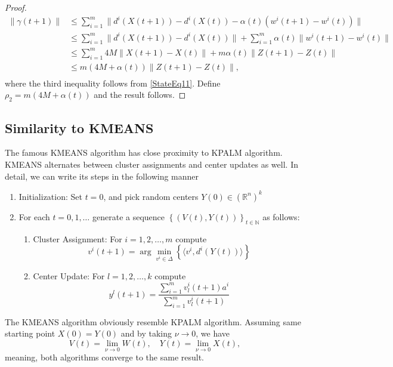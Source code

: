 \documentclass[11pt]{article}
\numberwithin{equation}{section}
\begin{document}
\begin{proof}
\begin{equation*}
\begin{aligned}
	\| \gamma(t+1) \|
	& \leq \sum\limits_{i=1}^{m} \| d^i(X(t+1)) - d^i(X(t)) - \alpha(t) \left( w^i(t+1) - w^i(t) \right) \| \\
	& \leq \sum\limits_{i=1}^{m} \| d^i(X(t+1)) - d^i(X(t)) \| + \sum\limits_{i=1}^{m} \alpha(t) \| w^i(t+1) - w^i(t) \| \\
	& \leq \sum\limits_{i=1}^{m} 4M \| X(t+1) - X(t) \| + m \alpha(t) \|Z(t+1) - Z(t)\| \\
	& \leq m \left( 4M + \alpha(t) \right) \|Z(t+1) - Z(t)\| , \\
\end{aligned}
\end{equation*}
where the third inequality follows from \cref{StateEq11}. Define $\rho_2 = m \left( 4M + \alpha(t) \right)$ and the result follows.
\end{proof}


\subsection{Similarity to KMEANS}
The famous KMEANS algorithm has close proximity to KPALM algorithm. KMEANS alternates between cluster assignments and center updates as well. In detail, we can write its steps in the following manner

\begin{enumerate}[(1)]
	\item Initialization: Set $t=0$, and pick random centers $Y(0) \in (\mathbb{R}^n)^k$

	\item For each $t=0,1, \ldots$ generate a sequence $\left\lbrace(V(t),Y(t))\right\rbrace_{t \in \mathbb{N}}$ as follows:
	\begin{enumerate}[(2.1)]
		\item Cluster Assignment: For $i=1, 2, \ldots ,m$ compute
		\begin{equation}
			v^i(t+1) = \arg\min\limits_{v^i \in \Delta} \left\lbrace \langle v^i , d^i(Y(t)) \rangle\right\rbrace \label{StateEq12}
		\end{equation}
		
		\item Center Update: For $l=1, 2, \ldots ,k$ compute
		\begin{equation}
			y^l(t+1) = \frac{\sum_{i=1}^{m} v^i_l(t+1) a^i}{\sum_{i=1}^{m} v^i_l(t+1)} \label{StateEq13}
		\end{equation}
	\end{enumerate}
\end{enumerate}
The KMEANS algorithm obviously resemble KPALM algorithm. Assuming same starting point $X(0) = Y(0)$ and by taking $\nu \to 0$, we have
\begin{equation*}
	V(t) = \lim_{\nu \to 0} W(t), \quad
	Y(t) = \lim_{\nu \to 0} X(t),
\end{equation*}
meaning, both algorithms converge to the same result.
\end{document}
